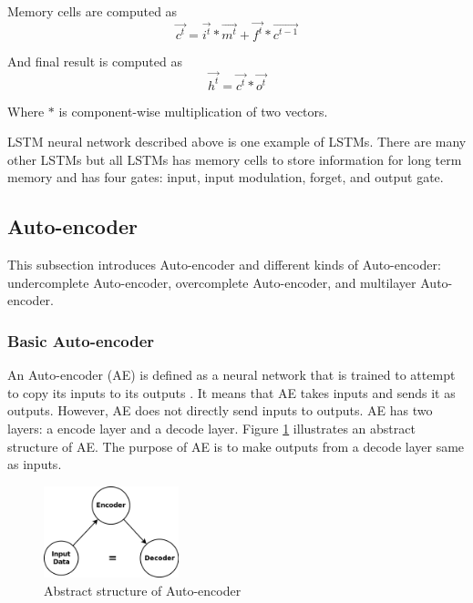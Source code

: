 \documentclass[draft,dvipsnames]{drexel-thesis}
\begin{document}
\begin{thesis}
\begin{enumerate}
	Memory cells are computed as
	$$\vec{c^t} = \vec{i^t} * \vec{m^t} + \vec{f^t} * \vec{c^{t-1}}$$

	And final result is computed as
	$$\vec{h^t} = \vec{c^t} * \vec{o^t}$$

	Where $*$ is component-wise multiplication of two vectors.
\end{enumerate}

	LSTM neural network described above is one example of LSTMs. There are many other LSTMs but all LSTMs has memory cells to store information for long term memory and has four gates: input, input modulation, forget, and output gate.



\subsection{Auto-encoder}\label{subsec:AE}

This subsection introduces Auto-encoder and different kinds of Auto-encoder: undercomplete Auto-encoder, overcomplete Auto-encoder, and multilayer Auto-encoder.


\subsubsection{Basic Auto-encoder}\label{subsubsec:BAE}
An Auto-encoder (AE) is defined as a neural network that is trained to attempt to copy its inputs to its outputs \cite{Goodfellow-et-al-2016}. It means that AE takes inputs and sends it as outputs. However, AE does not directly send inputs to outputs. AE has two layers: a encode layer and a decode layer. Figure \ref{fig:AE} illustrates an abstract structure of AE. The purpose of AE is to make outputs from a decode layer same as inputs.

\begin{figure}[t!]
    \centering
    \includegraphics[width=0.35\textwidth]{pictures/figures/AE.png}
    \caption{Abstract structure of Auto-encoder}
    \label{fig:AE}
\end{figure}


\end{thesis}
\end{document}
